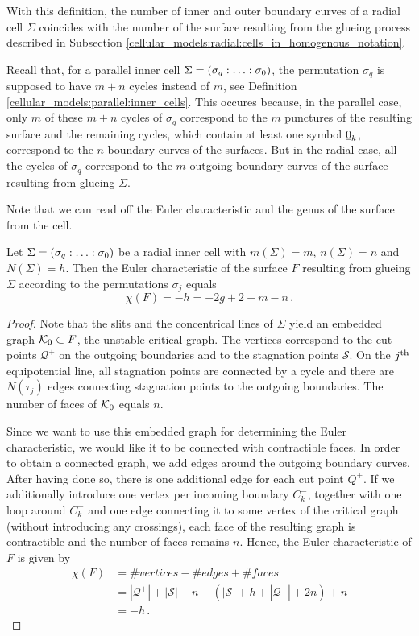 With this definition, the number of inner and outer boundary curves of a radial cell $\Sigma$
coincides with the number of the surface resulting from the glueing process described in Subsection \ref{cellular_models:radial:cells_in_homogenous_notation}.

\begin{rem}
   Recall that, for a parallel inner cell $\Sigma = \homogq$, the permutation $\sigma_q$ is supposed to have $m+n$ cycles instead of $m$, see Definition \ref{cellular_models:parallel:inner_cells}.
   This occures because, in the parallel case, only $m$ of these $m+n$ cycles of $\sigma_q$ correspond to the $m$ punctures of the resulting surface 
   and the remaining cycles, which contain at least one symbol $\underline{\smash{0}}_k$, correspond to the $n$ boundary curves of the surfaces.
   But in the radial case, all the cycles of $\sigma_q$ correspond to the $m$ outgoing boundary curves of the surface resulting from glueing $\Sigma$.
\end{rem}

Note that we can read off the Euler characteristic and the genus of the surface from the cell.

\begin{prop}
    Let $\Sigma = \homogq$ be a radial inner cell with $m(\Sigma) = m$, $n(\Sigma) = n$ and $N(\Sigma) = h$.
    Then the Euler characteristic of the surface $F$ resulting from glueing $\Sigma$ according to the permutations $\sigma_j$ equals
    \[
       \chi(F) = -h = - 2g + 2 - m - n\,.
    \]
\begin{proof}
    Note that the slits and the concentrical lines of $\Sigma$ yield an embedded graph $\mathcal{K}_0 \subset F$, the unstable critical graph.
    The vertices correspond to the cut points $\mathcal Q^+$ on the outgoing boundaries and to the stagnation points $\mathcal S$.
    On the $j^{\text{th}}$ equipotential line, all stagnation points are connected by a cycle and there are $N(\tau_j)$ edges connecting stagnation points to the outgoing boundaries.
    The number of faces of $\mathcal{K}_0$ equals $n$.
    
    Since we want to use this embedded graph for determining the Euler characteristic, we would like it to be connected with contractible faces. 
    In order to obtain a connected graph, we add edges around the outgoing boundary curves.
    After having done so, there is one additional edge for each cut point $Q^+$.
    If we additionally introduce one vertex per incoming boundary $C^-_k$, together with one loop around $C^-_k$ and one edge connecting it to some vertex of the critical graph (without introducing any crossings),
    each face of the resulting graph is contractible and the number of faces remains $n$.
    Hence, the Euler characteristic of $F$ is given by
    \begin{align*}
       \chi(F) &= \#vertices - \#edges + \#faces \\
               &= |\mathcal Q^+| + |\mathcal S| + n - (|\mathcal S| + h + |\mathcal Q^+| + 2n ) + n \\
               &= -h\,.
    \end{align*}
\end{proof}
\end{prop}


